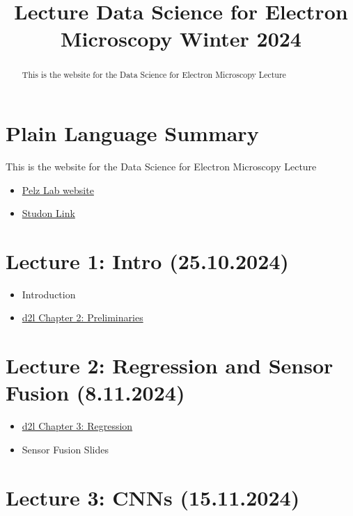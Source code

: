 \documentclass[
]{agujournal2019}
\providecommand{\tightlist}{%
  \setlength{\itemsep}{0pt}\setlength{\parskip}{0pt}}\usepackage{longtable,booktabs,array}
\begin{document}
\title{Lecture Data Science for Electron Microscopy Winter 2024}



\begin{abstract}
This is the website for the Data Science for Electron Microscopy Lecture
\end{abstract}

\section*{Plain Language Summary}
This is the website for the Data Science for Electron Microscopy Lecture




\begin{itemize}
\tightlist
\item
  \href{https://pelzlab.science}{Pelz Lab website}
\item
  \href{https://www.studon.fau.de/campo/course/421992}{Studon Link}
\end{itemize}

\section{Lecture 1: Intro
(25.10.2024)}\label{lecture-1-intro-25.10.2024}

\begin{itemize}
\tightlist
\item
  Introduction
\item
  \href{https://d2l.ai/chapter_preliminaries/index.html}{d2l Chapter 2:
  Preliminaries}
\end{itemize}

\section{Lecture 2: Regression and Sensor Fusion
(8.11.2024)}\label{sec-lecture2}

\begin{itemize}
\tightlist
\item
  \href{https://d2l.ai/chapter_linear-regression/index.html}{d2l Chapter
  3: Regression}
\item
  Sensor Fusion Slides
\end{itemize}

\section{Lecture 3: CNNs (15.11.2024)}\label{sec-lecture3}
\end{document}
